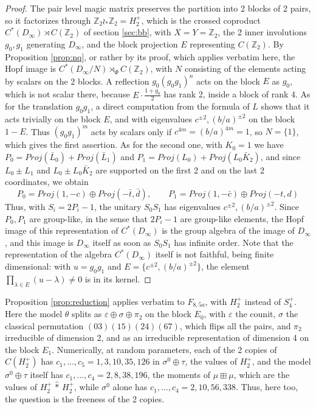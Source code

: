 \documentclass[11pt]{amsart}
\begin{document}
\begin{proof}
The pair level magic matrix preserves the partition into 2 blocks of 2 pairs, so it factorizes through $\mathbb Z_2\wr_*\mathbb Z_2=H_2^+$, which is the crossed coproduct $C^*(D_\infty)\rtimes C(\mathbb Z_2)$ of section \ref{sec:bb}, with $X=Y=\mathbb Z_2$, the 2 inner involutions $g_0,g_1$ generating $D_\infty$, and the block projection $E$ representing $C(\mathbb Z_2)$. By Proposition \ref{prop:nq}, or rather by its proof, which applies verbatim here, the Hopf image is $C^*(D_\infty/N)\rtimes_\Phi C(\mathbb Z_2)$, with $N$ consisting of the elements acting by scalars on the 2 blocks. A reflection $g_0(g_0g_1)^n$ acts on the block $E$ as $g_0$, which is not scalar there, because $E\cdot\frac{1+g_0}{2}$ has rank 2, inside a block of rank 4. As for the translation $g_0g_1$, a direct computation from the formula of $L$ shows that it acts trivially on the block $E$, and with eigenvalues $c^{\pm2},(b/a)^{\pm2}$ on the block $1-E$. Thus $(g_0g_1)^m$ acts by scalars only if $c^{4m}=(b/a)^{4m}=1$, so $N=\{1\}$, which gives the first assertion. As for the second one, with $K_0=1$ we have $P_0=Proj(\bar{L}_0)+Proj(\bar{L}_1)$ and $P_1=Proj(L_0)+Proj(L_0\bar{K}_2)$, and since $L_0\pm L_1$ and $L_0\pm L_0\bar{K}_2$ are supported on the first 2 and on the last 2 coordinates, we obtain
$$P_0=Proj(1,-c)\oplus Proj(-\bar{t},\bar{d}),\qquad P_1=Proj(1,-\bar{c})\oplus Proj(-t,d)$$
Thus, with $S_i=2P_i-1$, the unitary $S_0S_1$ has eigenvalues $c^{\pm2},(b/a)^{\pm2}$. Since $P_0,P_1$ are group-like, in the sense that $2P_i-1$ are group-like elements, the Hopf image of this representation of $C^*(D_\infty)$ is the group algebra of the image of $D_\infty$, and this image is $D_\infty$ itself as soon as $S_0S_1$ has infinite order. Note that the representation of the algebra $C^*(D_\infty)$ itself is not faithful, being finite dimensional: with $u=g_0g_1$ and $E=\{c^{\pm2},(b/a)^{\pm2}\}$, the element $\prod_{\lambda\in E}(u-\lambda)\neq0$ is in its kernel.
\end{proof}

\noindent Proposition \ref{prop:reduction} applies verbatim to $F_{8,5a}$, with $H_2^+$ instead of $S_4^+$. Here the model $\theta$ splits as $\varepsilon\oplus\sigma\oplus\pi_2$ on the block $E_0$, with $\varepsilon$ the counit, $\sigma$ the classical permutation $(03)(15)(24)(67)$, which flips all the pairs, and $\pi_2$ irreducible of dimension 2, and as an irreducible representation of dimension 4 on the block $E_1$. Numerically, at random parameters, each of the 2 copies of $C(H_2^+)$ has $c_1,\ldots,c_5=1,3,10,35,126$ in $\sigma^0\oplus\tau$, the values of $H_2^+$, and the model $\sigma^0\oplus\tau$ itself has $c_1,\ldots,c_4=2,8,38,196$, the moments of $\mu\boxplus\mu$, which are the values of $H_2^+\,\hat{*}\,H_2^+$, while $\sigma^0$ alone has $c_1,\ldots,c_4=2,10,56,338$. Thus, here too, the question is the freeness of the 2 copies.
\end{document}
